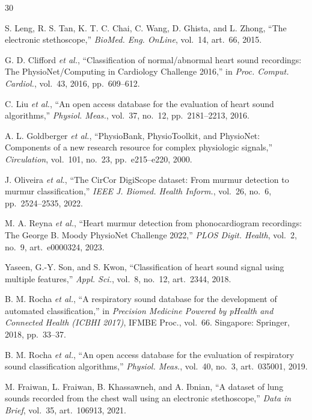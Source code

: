 \documentclass[conference]{IEEEtran}
\begin{document}
\begin{thebibliography}{30}

S. Leng, R. S. Tan, K. T. C. Chai, C. Wang, D. Ghista, and L. Zhong, ``The electronic stethoscope,'' \emph{BioMed. Eng. OnLine}, vol.~14, art.~66, 2015.

G. D. Clifford \emph{et al.}, ``Classification of normal/abnormal heart sound recordings: The PhysioNet/Computing in Cardiology Challenge 2016,'' in \emph{Proc. Comput. Cardiol.}, vol.~43, 2016, pp.~609--612.

C. Liu \emph{et al.}, ``An open access database for the evaluation of heart sound algorithms,'' \emph{Physiol. Meas.}, vol.~37, no.~12, pp.~2181--2213, 2016.

A. L. Goldberger \emph{et al.}, ``PhysioBank, PhysioToolkit, and PhysioNet: Components of a new research resource for complex physiologic signals,'' \emph{Circulation}, vol.~101, no.~23, pp.~e215--e220, 2000.

J. Oliveira \emph{et al.}, ``The CirCor DigiScope dataset: From murmur detection to murmur classification,'' \emph{IEEE J. Biomed. Health Inform.}, vol.~26, no.~6, pp.~2524--2535, 2022.

M. A. Reyna \emph{et al.}, ``Heart murmur detection from phonocardiogram recordings: The George B. Moody PhysioNet Challenge 2022,'' \emph{PLOS Digit. Health}, vol.~2, no.~9, art.~e0000324, 2023.

Yaseen, G.-Y. Son, and S. Kwon, ``Classification of heart sound signal using multiple features,'' \emph{Appl. Sci.}, vol.~8, no.~12, art.~2344, 2018.

B. M. Rocha \emph{et al.}, ``A respiratory sound database for the development of automated classification,'' in \emph{Precision Medicine Powered by pHealth and Connected Health (ICBHI 2017)}, IFMBE Proc., vol.~66. Singapore: Springer, 2018, pp.~33--37.

B. M. Rocha \emph{et al.}, ``An open access database for the evaluation of respiratory sound classification algorithms,'' \emph{Physiol. Meas.}, vol.~40, no.~3, art.~035001, 2019.

M. Fraiwan, L. Fraiwan, B. Khassawneh, and A. Ibnian, ``A dataset of lung sounds recorded from the chest wall using an electronic stethoscope,'' \emph{Data in Brief}, vol.~35, art.~106913, 2021.


\end{thebibliography}
\end{document}
